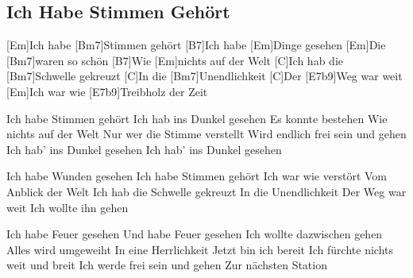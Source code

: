 \subsection*{Ich Habe Stimmen Gehört   }



\begin{guitar}



[Em]Ich habe [Bm7]Stimmen gehört
[B7]Ich habe [Em]Dinge gesehen
[Em]Die [Bm7]waren so schön
[B7]Wie [Em]nichts auf der Welt
[C]Ich hab die [Bm7]Schwelle gekreuzt
[C]In die [Bm7]Unendlichkeit
[C]Der [E7b9]Weg war weit
[Em]Ich war wie [E7b9]Treibholz der Zeit


Ich habe Stimmen gehört
Ich hab ins Dunkel gesehen
Es konnte bestehen
Wie nichts auf der Welt
Nur wer die Stimme verstellt
Wird endlich frei sein und gehen
Ich hab' ins Dunkel gesehen
Ich hab' ins Dunkel gesehen

Ich habe Wunden gesehen
Ich habe Stimmen gehört
Ich war wie verstört
Vom Anblick der Welt
Ich hab die Schwelle gekreuzt
In die Unendlichkeit
Der Weg war weit
Ich wollte ihn gehen

Ich habe Feuer gesehen
Und habe Feuer gesehen
Ich wollte dazwischen gehen
Alles wird umgeweiht
In eine Herrlichkeit
Jetzt bin ich bereit
Ich fürchte nichts weit und breit
Ich werde frei sein und gehen
Zur nächsten Station

\end{guitar}
